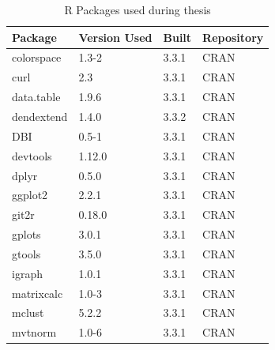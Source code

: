 \setlength{\LTleft}{-20cm plus -1fill}
\setlength{\LTright}{\LTleft}

\begin{longtable}{llll}
\caption{R Packages used during thesis}
\label{tab:computers_r_packages}
\\
\multicolumn{1}{l}{\bfseries Package}      & \multicolumn{1}{l}{\bfseries Version Used} & \multicolumn{1}{l}{\bfseries Built} & \multicolumn{1}{l}{\bfseries Repository}      \\
\hline  \rowcolor{black!10}
colorspace   & 1.3-2          & 3.3.1 & \gls{CRAN}            \\
\rowcolor{black!5}
curl         & 2.3            & 3.3.1 & \gls{CRAN}            \\
\rowcolor{black!10}
data.table   & 1.9.6          & 3.3.1 & \gls{CRAN}            \\
\rowcolor{black!5}
dendextend   & 1.4.0          & 3.3.2 & \gls{CRAN}            \\
\rowcolor{black!10}
DBI          & 0.5-1          & 3.3.1 & \gls{CRAN}            \\
\rowcolor{black!5}
devtools     & 1.12.0         & 3.3.1 & \gls{CRAN}            \\
\rowcolor{black!10}
dplyr        & 0.5.0          & 3.3.1 & \gls{CRAN}            \\
\rowcolor{black!5}
ggplot2      & 2.2.1          & 3.3.1 & \gls{CRAN}            \\
\rowcolor{black!10}
git2r        & 0.18.0         & 3.3.1 & \gls{CRAN}            \\
\rowcolor{black!5}
gplots       & 3.0.1          & 3.3.1 & \gls{CRAN}            \\
\rowcolor{black!10}
gtools       & 3.5.0          & 3.3.1 & \gls{CRAN}            \\
\rowcolor{black!5}
igraph       & 1.0.1          & 3.3.1 & \gls{CRAN}            \\
\rowcolor{black!10}
matrixcalc   & 1.0-3          & 3.3.1 & \gls{CRAN}            \\
\rowcolor{black!5}
mclust       & 5.2.2          & 3.3.1 & \gls{CRAN}            \\
\rowcolor{black!10}
mvtnorm      & 1.0-6          & 3.3.1 & \gls{CRAN}            \\

\end{longtable}
